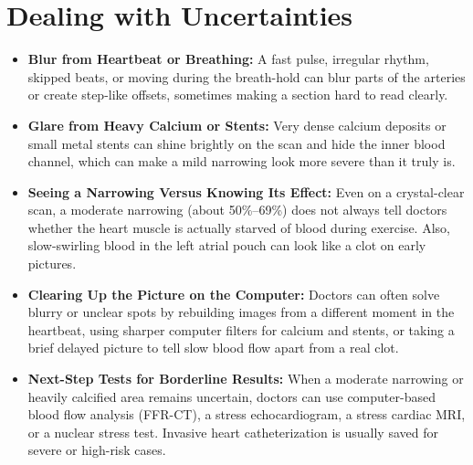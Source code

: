 \section{Dealing with Uncertainties}
\begin{itemize}
    \item \textbf{Blur from Heartbeat or Breathing:} A fast pulse, irregular rhythm, skipped beats, or moving during the breath-hold can blur parts of the arteries or create step-like offsets, sometimes making a section hard to read clearly.
    \item \textbf{Glare from Heavy Calcium or Stents:} Very dense calcium deposits or small metal stents can shine brightly on the scan and hide the inner blood channel, which can make a mild narrowing look more severe than it truly is.
    \item \textbf{Seeing a Narrowing Versus Knowing Its Effect:} Even on a crystal-clear scan, a moderate narrowing (about 50\%--69\%) does not always tell doctors whether the heart muscle is actually starved of blood during exercise. Also, slow-swirling blood in the left atrial pouch can look like a clot on early pictures.
    \item \textbf{Clearing Up the Picture on the Computer:} Doctors can often solve blurry or unclear spots by rebuilding images from a different moment in the heartbeat, using sharper computer filters for calcium and stents, or taking a brief delayed picture to tell slow blood flow apart from a real clot.
    \item \textbf{Next-Step Tests for Borderline Results:} When a moderate narrowing or heavily calcified area remains uncertain, doctors can use computer-based blood flow analysis (FFR-CT), a stress echocardiogram, a stress cardiac MRI, or a nuclear stress test. Invasive heart catheterization is usually saved for severe or high-risk cases.
\end{itemize}

